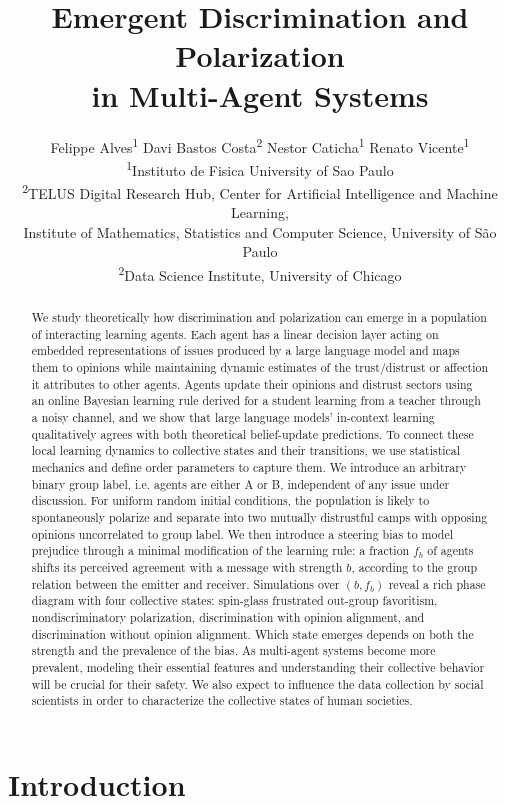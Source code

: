 \documentclass{article}
\title{Emergent Discrimination and Polarization \\ in Multi-Agent Systems}
\author{Felippe Alves\textsuperscript{1} \quad 
Davi Bastos Costa\textsuperscript{2} \quad 
Nestor Caticha\textsuperscript{1} \quad
Renato Vicente\textsuperscript{1} \\
\normalfont\textsuperscript{1}Instituto de Fisica  University of Sao Paulo\\
\normalfont\textsuperscript{2}TELUS Digital Research Hub, Center for Artificial
Intelligence and Machine Learning, \\
\normalfont Institute of Mathematics, Statistics and Computer Science,
University of São Paulo \\
\normalfont\textsuperscript{2}Data Science Institute, University of Chicago \\}
\begin{document}
\maketitle

\begin{abstract}
We study theoretically how discrimination and polarization can emerge in a population of interacting learning agents. Each agent has a linear decision layer acting on embedded representations of issues produced by a large language model and maps them to opinions while maintaining dynamic estimates of the trust/distrust or affection it attributes to other agents. Agents update their opinions and distrust sectors using an online Bayesian learning rule derived for a student learning from a teacher through a noisy channel, and we show that large language models’ in-context learning qualitatively agrees with both theoretical belief-update predictions. To connect these local learning dynamics to collective states and their transitions, we use statistical mechanics and define order parameters to capture them. We introduce an arbitrary binary group label, i.e. agents are either A or B, independent of any issue under discussion. For uniform random initial conditions, the population is likely to spontaneously polarize and separate into two mutually distrustful camps with opposing opinions uncorrelated to group label. We then introduce a steering bias to model prejudice through a minimal modification of the learning rule: a fraction $f_b$ of agents shifts its perceived agreement with a message with strength $b$, according to the group relation between the emitter and receiver. Simulations over $(b,f_b)$ reveal a rich phase diagram with four collective states: spin-glass frustrated out-group favoritism, nondiscriminatory polarization, discrimination with opinion alignment, and discrimination without opinion alignment. Which state emerges depends on both the strength and the prevalence of the bias. As multi-agent systems become more prevalent, modeling their essential features and understanding their collective behavior will be crucial for their safety. We also expect to influence the data collection by social scientists in order to characterize the collective states of human societies.
\end{abstract}


\section{Introduction}
\label{sec:intro}
\end{document}
